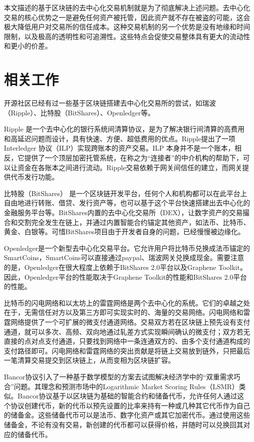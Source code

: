 \documentclass[UTF8,nofonts]{ctexart}
\begin{document}
本文描述的基于区块链的去中心化交易机制就是为了彻底解决上述问题。去中心化交易的核心优势之一是避免任何资产被托管，因此资产就不存在被盗的可能，这会极大降低用户对交易所的信任成本。这种交易机制的另一个优势是没有地缘和时间限制，以及极高的透明性和可追溯性。这些特点会促使交易整体具有更大的流动性和更小的价差。

\section{相关工作\label{sec:existingworks}}

开源社区已经有过一些基于区块链搭建去中心化交易所的尝试，如瑞波（Ripple）、比特股（BitShares）、Openledger等。

Ripple \cite{schwartz2014ripple} 是一个去中心化的银行系统间清算协议，是为了解决银行间清算的高费用和高延迟问题而设计，具有快速、方便、超低费用的优点。Ripple提出了一项Interledger \cite{thomas2015protocol} 协议（ILP）实现跨账本的资产交易。ILP 本身并不是一个账本，相反，它提供了一个顶层加密托管系统，在称之为“连接者”的中介机构的帮助下，可以让资金在各账本之间进行流动。Ripple交易依赖于网关间信任的建立，而网关提供代币发行功能。

比特股（BitShares） \cite{schuhbitshares}\cite{schuh2015bitshares}  是一个区块链开发平台，任何个人和机构都可以在此平台上自由地进行转账、借贷、发行资产等，也可以基于这个平台快速搭建出去中心化的金融服务平台等。BitShares内置的去中心化交易所（DEX），让数字资产的交易撮合和交割完全发生在链上，并通过内置智能合约锚定其他资产，如法币、比特币、黄金、白银等。可惜BitShares项目由于开发者自身的问题，已经慢慢被边缘化。

Openledger\cite{openledger}是一个新型去中心化交易平台。它允许用户将比特币兑换成法币锚定的SmartCoins，SmartCoins可以直接通过paypal、瑞波网关兑换成现金。需要注意的是，Openledger在很大程度上依赖于BitShares 2.0平台以及Graphene Toolkit。因此，Openledger平台的性能取决于Graphene Toolkit的性能和BitShares 2.0平台的性能。

比特币的闪电网络\cite{poon2015bitcoin}和以太坊上的雷霆网络\cite{raidennetwork}是两个去中心化的系统。它们的卓越之处在于，无需信任对方以及第三方即可实现实时的、海量的交易网络。闪电网络和雷霆网络提供了一个可扩展的微支付通道网络。交易双方若在区块链上预先设有支付通道，就可以多次、高频、双向地通过轧差方式实现瞬间确认的微支付；双方若无直接的点对点支付通道，只要找到网络中一条连通双方的、由多个支付通道构成的支付路径即可。闪电网络和雷霆网络的突出贡献是将链上交易放到链外，只把最后一笔清算交易提交到区块链上，从而变相为区块链扩容。

Bancor\cite{bancor}协议引入了一种基于数学模型的方案去试图解决经济学中的“双重需求巧合”问题。其理念和预测市场中的Logarithmic Market Scoring Rules（LSMR）\cite{hanson2012logarithmic}类似。Bancor协议基于以区块链为基础的智能合约和储备代币，允许任何人通过这个协议创建代币，新的代币以预先设置的比率来持有一种或几种其它代币作为自己的储备金。这些储备代币可以是法币、数字化资产或其它加密代币。通过使用这些储备金，不论有没有交易，新创建的代币都可以获得价格，并随时可以兑换回其对应的储备代币。
\end{document}
